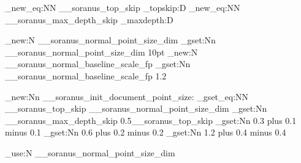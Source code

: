 %
%
%
% 
%

%

%

\cs_new_eq:NN \g__soranus_top_skip \tex_topskip:D
\cs_new_eq:NN \g__soranus_max_depth_skip \tex_maxdepth:D

\dim_new:N \g__soranus_normal_point_size_dim
\dim_gset:Nn \g__soranus_normal_point_size_dim {10pt}
\fp_new:N \g__soranus_normal_baseline_scale_fp
\fp_gset:Nn \g__soranus_normal_baseline_scale_fp {1.2}


%

\cs_new:Nn \__soranus_init_document_point_size:
  {
    \dim_gset_eq:NN \g__soranus_top_skip \g__soranus_normal_point_size_dim
    \dim_gset:Nn \g__soranus_max_depth_skip {0.5\g__soranus_top_skip}
    \skip_gset:Nn \smallskipamount
      {
         {0.3}
        plus  {0.1}
        minus  {0.1}
      }
    \skip_gset:Nn \medskipamount
      {
         {0.6}
        plus  {0.2}
        minus  {0.2}
      }
    \skip_gset:Nn \bigskipamount
      {
         {1.2}
        plus  {0.4}
        minus  {0.4}
      }
  }


%

\NewDocumentCommand \NormalPointSize {}
  {\dim_use:N \g__soranus_normal_point_size_dim}


